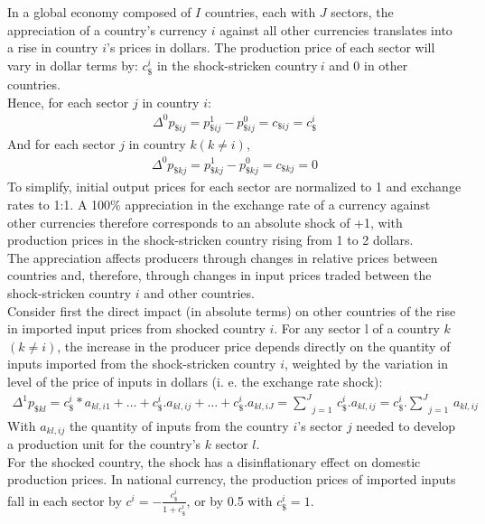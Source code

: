 \documentclass[11pt,a4paper]{article}
\begin{document}
In a global economy composed of $I$ countries, each with $J$ sectors, the appreciation of a country's currency $i$ against all other currencies translates into a rise in country $i$'s prices in dollars. The production price of each sector will vary in dollar terms by: $c_\$^i$ in the shock-stricken country$~i$ and 0 in other countries. \\
Hence, for each sector $j$ in country  $i$:
\begin{eqnarray*}
 {{\Delta }^{0}}p_{\${ij}}=p_{\${ij}}^{1}-p_{\${ij}}^{0}=c_{\${ij}}=c_{\$}^i
  \end{eqnarray*}	
And for each sector $j$ in country $k (k\ne i)$,
\begin{eqnarray*}
 {{\Delta }^{0}}p_{\${kj}}=p_{\${kj}}^{1}-p_{\${kj}}^{0}=c_{\${kj}}=0
 \end{eqnarray*}	
To simplify, initial output prices for each sector are normalized to 1 and exchange rates to 1:1. A 100$\%$ appreciation in the exchange rate of a currency against other currencies therefore corresponds to an absolute shock of +1, with production prices in the shock-stricken country rising from 1 to 2 dollars.\\
The appreciation affects producers through changes in relative prices between countries and, therefore, through changes in input prices traded between the shock-stricken country $i$ and other countries. \\
Consider first the direct impact (in absolute terms) on other countries of the rise in imported input prices from shocked country $i$. For any sector l of a country $k$ $(k\ne i)$, the increase in the producer price depends directly on the quantity of inputs imported from the shock-stricken country $i$, weighted by the variation in level of the price of inputs in dollars (i. e. the exchange rate shock):\\
\begin{eqnarray}
\Delta ^1 p_{\${kl}}=c_\$^i*a_{kl,i1}+\ldots+c_\$^i.a_{kl,ij}+\ldots+c_\$^i.a_{kl,iJ}=\underset{j=1}{\overset{J}{\mathop\sum}}\,c_\$^i.a_{kl,ij}=c_\$^i.\underset{j=1}{\overset{J}{\mathop\sum}}\,a_{kl,ij}  
\label{eq:eq1} 
\end{eqnarray}
With $a_{kl,ij}$ the quantity of inputs from the country $i$'s sector $j$ needed to develop a production unit for the country's $k$ sector $l$. \\
For the shocked country, the shock has a disinflationary effect on domestic production prices. In national currency, the production prices of imported inputs fall in each sector by $c^i=-\frac{c_\$^i}{1+{c_\$^i}}$, or by 0.5 with $c_\$^i=1$. \\
\end{document}
